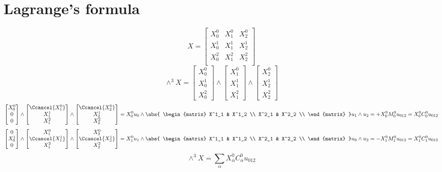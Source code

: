 \documentclass{scrartcl}
\begin{document}
\section{Lagrange's formula}
\[
  X =
  \begin{bmatrix}
    X^0_0 & X^0_1 & X^0_2 \\
    X^1_0 & X^1_1 & X^1_2 \\
    X^2_0 & X^2_1 & X^2_2 \\
  \end{bmatrix}
\]
\[
  \wedge^3 X =
  \begin{bmatrix}
    X^0_0 \\ X^1_0 \\ X^2_0
  \end{bmatrix}
  \wedge
  \begin{bmatrix}
    X^0_1 \\ X^1_1 \\ X^2_1
  \end{bmatrix}
  \wedge
  \begin{bmatrix}
    X^0_2 \\ X^1_2 \\ X^2_2
  \end{bmatrix}
\]
\[
  \begin{bmatrix}
    X^0_0 \\ 0 \\ 0
  \end{bmatrix}
  \wedge
  \begin{bmatrix}
    \Ccancel{X^0_1} \\ X^1_1 \\ X^2_1
  \end{bmatrix}
  \wedge
  \begin{bmatrix}
    \Ccancel{X^0_2} \\ X^1_2 \\ X^2_2
  \end{bmatrix}
  = X^0_0u_0 \wedge \abs{
    \begin{matrix}
      X^1_1 & X^1_2 \\
      X^2_1 & X^2_2 \\
    \end{matrix}
  }
    u_1\wedge u_2
  = + X^0_0 M^0_0 u_{012} = X^0_0 C^0_0 u_{012}
\]
\[
  \begin{bmatrix}
    0 \\ X^1_0 \\ 0
  \end{bmatrix}
  \wedge
  \begin{bmatrix}
    {X^0_1} \\ \Ccancel{X^1_1} \\ X^2_1
  \end{bmatrix}
  \wedge
  \begin{bmatrix}
    {X^0_2} \\ \Ccancel{X^1_2} \\ X^2_2
  \end{bmatrix}
  = X^0_1u_1 \wedge \abs{
    \begin{matrix}
      X^1_1 & X^1_2 \\
      X^2_1 & X^2_2 \\
    \end{matrix}
  }
    u_0\wedge u_2
  = -X^0_1 M^0_1 u_{012} = X^0_1C^0_1u_{012}
\]
\[
  \wedge^3 X = \sum_\alpha X^0_\alpha C^0_\alpha u_{012}
\]
\end{document}
